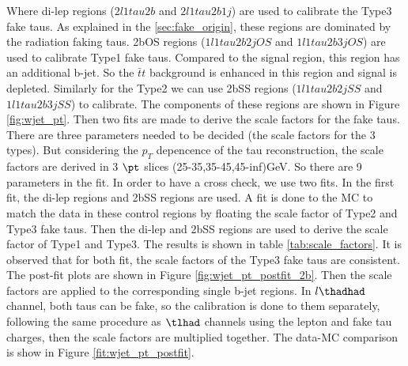 Where di-lep regions ($2l1tau2b$ and $2l1tau2b1j$) are used to calibrate the Type3 fake taus. As explained in the \ref{sec:fake_origin}, these regions are dominated by the radiation faking taus. 2bOS regions ($1l1tau2b2j OS$ and $1l1tau2b3j OS$) are used to calibrate Type1 fake taus. Compared to the signal region, this region has an additional b-jet. So the $\bar{t}t$ background is enhanced in this region and signal is depleted. Similarly for the Type2 we can use 2bSS regions ($1l1tau2b2j SS$
and $1l1tau2b3j SS$) to calibrate. The components of these regions are shown in Figure \ref{fig:wjet_pt}. Then two fits are made to derive the scale factors for the fake taus. There are three parameters needed to be decided (the scale factors for the 3 types). But considering the $p_{T}$ depencence of the tau reconstruction, the scale factors are derived in 3 $\pt$ slices (25-35,35-45,45-inf)GeV. So there are 9 parameters in the fit. In order to have a cross check, we use two fits. In the first fit, the di-lep regions and 2bSS regions are used. A fit is done to the MC to match the data in these control regions by floating the scale factor of Type2 and Type3 fake taus. Then the di-lep and 2bSS regions are used to derive the scale factor of Type1 and Type3. The results is shown in table \ref{tab:scale_factors}. It is observed that for both fit, the scale factors of the Type3 fake taus are consistent. The post-fit plots are shown in Figure \ref{fig:wjet_pt_postfit_2b}. Then the scale factors are applied to the corresponding single b-jet regions. In $l\thadhad$ channel, both taus can be fake, so the calibration is done to them separately, following the same procedure as $\tlhad$ channels using the lepton and fake tau charges, then the scale factors are multiplied together. The data-MC comparison is show in Figure \ref{fit:wjet_pt_postfit}.

